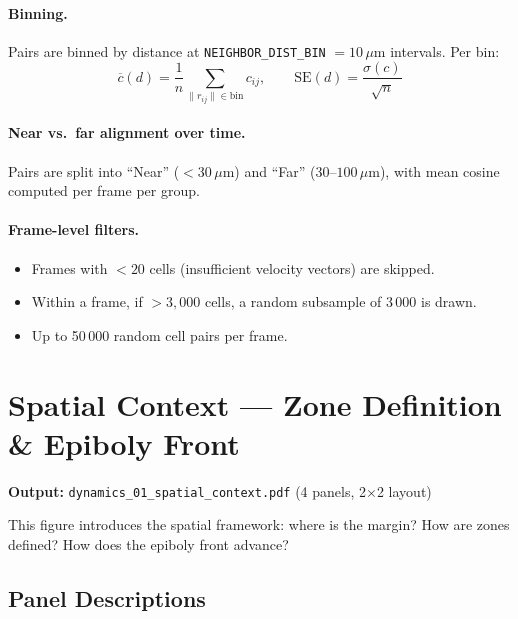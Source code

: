 \documentclass[11pt,a4paper]{article}
\newcommand{\um}{\,\mu\text{m}}
\newcommand{\param}[1]{\texttt{#1}}
\begin{document}
\paragraph{Binning.}  Pairs are binned by distance at
\param{NEIGHBOR\_DIST\_BIN} $= 10\um$ intervals.  Per bin:
\[
  \overline{c}(d) = \frac{1}{n}\sum_{\|r_{ij}\|\in\mathrm{bin}} c_{ij},
  \qquad
  \mathrm{SE}(d) = \frac{\sigma(c)}{\sqrt{n}}
\]

\paragraph{Near vs.\ far alignment over time.}
Pairs are split into ``Near'' ($< 30\um$) and ``Far'' ($30$--$100\um$),
with mean cosine computed per frame per group.

\paragraph{Frame-level filters.}
\begin{itemize}[nosep]
  \item Frames with $< 20$ cells (insufficient velocity vectors) are skipped.
  \item Within a frame, if $> 3{,}000$ cells, a random subsample of 3\,000
        is drawn.
  \item Up to 50\,000 random cell pairs per frame.
\end{itemize}


\newpage

\section{Spatial Context --- Zone Definition \& Epiboly Front}
\label{fig:spatial_context}

\noindent\textbf{Output:} \texttt{dynamics\_01\_spatial\_context.pdf}
(4 panels, 2$\times$2 layout)

This figure introduces the spatial framework: where is the margin? How are
zones defined? How does the epiboly front advance?

\subsection*{Panel Descriptions}
\end{document}
